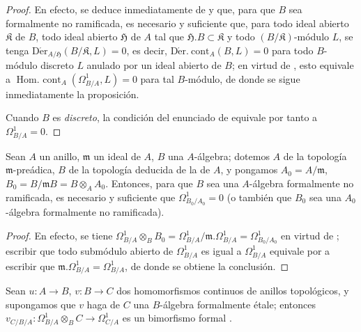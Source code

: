 \begin{proof}
En efecto, se deduce inmediatamente de  y
 que, para que $B$ sea formalmente no ramificada, es necesario y
suficiente que, para todo ideal abierto $\mathfrak{K}$ de $B$, todo ideal abierto
$\mathfrak{H}$ de $A$ tal que $\mathfrak{H}.B\subset\mathfrak{K}$ y todo
$(B/\mathfrak{K})$-módulo $L$, se tenga
$\operatorname{D\acute{e}r}_{A/\mathfrak{H}}(B/\mathfrak{K},L)=0$,
es decir, $\operatorname{D\acute{e}r.\ cont}_A(B,L)=0$ para todo
$B$-módulo discreto $L$ anulado por un ideal abierto de $B$; en virtud de
, esto equivale a
$\operatorname{Hom.\ cont}_A(\Omega^1_{B/A},L)=0$ para tal $B$-módulo,
de donde se sigue inmediatamente la proposición.

Cuando $B$ es \emph{discreto}, la condición del enunciado de
 equivale por tanto a $\Omega^1_{B/A}=0$.
\end{proof}

\begin{corollary}[20.7.5]
\label{0.20.7.5-fr}
Sean $A$ un anillo, $\mathfrak{m}$ un ideal de $A$, $B$ una $A$-álgebra;
dotemos $A$ de la topología $\mathfrak{m}$-preádica, $B$ de la topología
deducida de la de $A$, y pongamos $A_0=A/\mathfrak{m}$,
$B_0=B/\mathfrak{m}B=B\otimes_A A_0$. Entonces, para que $B$ sea una
$A$-álgebra formalmente no ramificada, es necesario y suficiente que
$\Omega^1_{B_0/A_0}=0$ \textup{(o también que $B_0$ sea una} $A_0$-álgebra
formalmente no ramificada).
\end{corollary}

\begin{proof}
En efecto, se tiene
$\Omega^1_{B/A}\otimes_B B_0=\Omega^1_{B/A}/\mathfrak{m}.\Omega^1_{B/A}
=\Omega^1_{B_0/A_0}$ en virtud de ; escribir que todo
submódulo abierto de $\Omega^1_{B/A}$ es igual a $\Omega^1_{B/A}$ equivale
por  a escribir que
$\mathfrak{m}.\Omega^1_{B/A}=\Omega^1_{B/A}$, de donde se obtiene la conclusión.
\end{proof}

\begin{proposition}[20.7.6]
\label{0.20.7.6-fr}
Sean $u:A\to B$, $v:B\to C$ dos homomorfismos continuos de anillos
topológicos, y supongamos que $v$ haga de $C$ una $B$-álgebra formalmente
étale; entonces $v_{C/B/A}:\Omega^1_{B/A}\otimes_B C\to\Omega^1_{C/A}$ es un
bimorfismo formal \textup{}.
\end{proposition}

